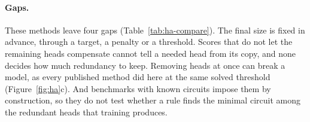 \paragraph{Gaps.}
These methods leave four gaps (Table~\ref{tab:ha-compare}). The final size is fixed in advance, through a target, a penalty or a threshold. Scores that do not let the remaining heads compensate cannot tell a needed head from its copy, and none decides how much redundancy to keep. Removing heads at once can break a model, as every published method did here at the same solved threshold (Figure~\ref{fig:ha}c). And benchmarks with known circuits impose them by construction, so they do not test whether a rule finds the minimal circuit among the redundant heads that training produces.

\newcommand{\yes}{\tikz[baseline=-0.6ex]\fill (0,0) circle (0.75mm);}
\newcommand{\yesHA}{\tikz[baseline=-0.6ex]\fill[art] (0,0) circle (0.75mm);}
\newcommand{\no}{\textcolor{black!50}{--}}
\newcommand{\grp}[1]{\multicolumn{7}{@{}l}{\scriptsize\textcolor{black!55}{#1}}\\[-2pt]}
\newcommand{\meth}[2]{\begin{tabular}[t]{@{}l@{}}#1\\[-3pt]{\scriptsize\textcolor{black!60}{#2}}\end{tabular}}
\newcommand{\hd}[1]{\scriptsize\bfseries #1}

